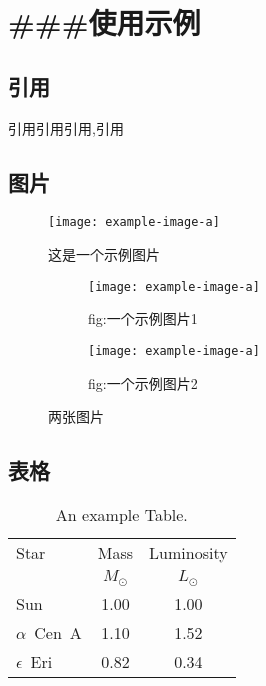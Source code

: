 



\chapter{\#\#\#使用示例}

\section{引用}
 引用\cite{BQC_2020}引用\cite{向守平2008天体物理概论}引用\cite{2019First},引用\cite{BQC_2020,向守平2008天体物理概论,2019First}


\section{图片}

\begin{figure}[htbp]
	\centering
	\texttt{[image: example-image-a]}%
	\caption{这是一个示例图片}
	\label{fig:一个示例图片}
\end{figure}







\begin{figure}
    \centering
    \begin{subfigure}{0.49\textwidth}
        \centering
        \texttt{[image: example-image-a]}
        \caption{fig:一个示例图片1}
        \label{label1}
    \end{subfigure}
    \begin{subfigure}{0.49\textwidth}
        \centering
        \texttt{[image: example-image-a]}
        \caption{fig:一个示例图片2}
        \label{label2}
    \end{subfigure}
    \caption{两张图片}
\end{figure}



\section{表格}
\begin{table}[htbp]
	\centering
	\caption{An example Table.}
	\label{tab:example-tab}
	\begin{tabular}{lcc}
		\toprule
		Star           & Mass        & Luminosity  \\
		               & $M_{\odot}$ & $L_{\odot}$ \\
		\midrule
		Sun            & 1.00        & 1.00        \\
		$\alpha$~Cen~A & 1.10        & 1.52        \\
		$\epsilon$~Eri & 0.82        & 0.34        \\
		\bottomrule
	\end{tabular}
\end{table}



\zhlipsum

